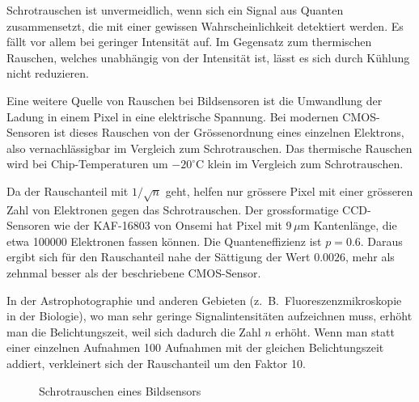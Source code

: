 \begin{diskussion}
Schrotrauschen ist unvermeidlich, wenn sich ein Signal aus Quanten
zusammensetzt, die mit einer gewissen Wahrscheinlichkeit detektiert werden.
Es fällt vor allem bei geringer Intensität auf.
Im Gegensatz zum thermischen Rauschen, welches unabhängig von der
Intensität ist, lässt es sich durch Kühlung nicht reduzieren.

Eine weitere Quelle von Rauschen bei Bildsensoren ist die Umwandlung
der Ladung in einem Pixel in eine elektrische Spannung. 
Bei modernen CMOS-Sensoren ist dieses Rauschen von der Grössenordnung
eines einzelnen Elektrons, also vernachlässigbar im Vergleich zum
Schrotrauschen.
Das thermische Rauschen wird bei Chip-Temperaturen um $-20^\circ\text{C}$
klein im Vergleich zum Schrotrauschen.

Da der Rauschanteil mit $1/\sqrt{n}$ geht, helfen nur grössere Pixel mit
einer grösseren Zahl von Elektronen gegen das Schrotrauschen.
Der grossformatige CCD-Sensoren wie der KAF-16803 von Onsemi hat
Pixel mit $9\,\mu\text{m}$ Kantenlänge, die etwa 100000 Elektronen
fassen können. 
Die Quanteneffizienz ist $p=0.6$.
Daraus ergibt sich für den Rauschanteil nahe der Sättigung der
Wert $0.0026$, mehr als zehnmal besser als der beschriebene
CMOS-Sensor.

In der Astrophotographie und anderen Gebieten (z.~B.~Fluoreszenzmikroskopie
in der Biologie), wo man sehr geringe Signalintensitäten aufzeichnen muss,
erhöht man die Belichtungszeit, weil sich dadurch die Zahl $n$ erhöht. 
Wenn man statt einer einzelnen Aufnahmen 100 Aufnahmen mit der gleichen
Belichtungszeit addiert, verkleinert sich der Rauschanteil um den
Faktor 10.
\end{diskussion}

\begin{figure}[h]
\centering
{}
\caption{Schrotrauschen eines Bildsensors
\label{50000039:shotnoise}}
\end{figure}


